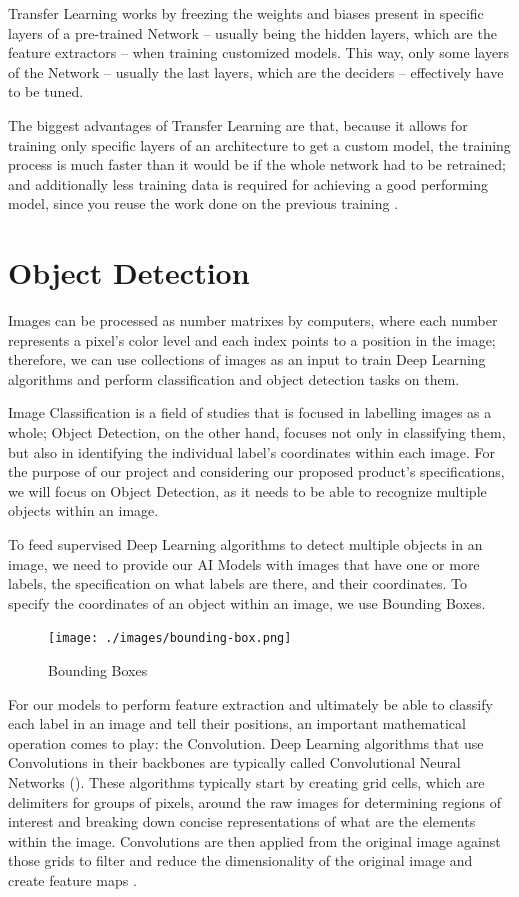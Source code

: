 \documentclass[openright]{normas-utf-tex} %
\begin{document}
Transfer Learning works by freezing the weights and biases present in specific layers of a
pre-trained Network -- usually being the hidden layers, which are the feature extractors -- 
when training customized models. This way,  only some layers of the Network -- usually the last layers, which 
are the deciders -- effectively have to be tuned.

The biggest advantages of Transfer Learning are that, because it allows for
training only specific layers of an architecture to get a custom model, the
training process is much faster than it would be if the whole network had to be
retrained; and additionally less training data is required for achieving a good
performing model, since you reuse the work done on the previous training
\cite{CS231N}.

\section{Object Detection}

Images can be processed as number matrixes by computers, where each number represents a 
pixel's color level and each index points to a position in the image;
therefore, we can use collections of images as an input to train Deep Learning algorithms 
and perform classification and object detection tasks on them. 

Image Classification is a field of studies that is focused in labelling images as a whole; 
Object Detection, on the other hand, focuses not only in classifying them, but also in identifying the individual
label's coordinates within each image. For the purpose of our project and considering our proposed product's specifications,
we will focus on Object Detection, as it needs to be able to recognize multiple objects within an image. 

To feed supervised Deep Learning algorithms to detect multiple objects in an image, we need to provide our AI Models with 
images that have one or more labels, the specification on what labels are there, and their coordinates.
To specify the coordinates of an object within an image, we use Bounding Boxes.

\begin{figure}[H]
	\centering
	\texttt{[image: ./images/bounding-box.png]}
	\caption[Bounding Boxes]{Bounding Boxes}
	\label{fig:boundingBoxes}
\end{figure}

For our models to perform feature extraction and ultimately be able to classify each label in an image and tell their positions,
an important mathematical operation comes to play: the Convolution. 
Deep Learning algorithms that use Convolutions in their backbones are typically called Convolutional Neural Networks
(). 
These algorithms typically start by creating grid cells, which are delimiters for groups of pixels, around the raw images for 
determining regions of interest and breaking down concise representations of what are the elements within the image.
Convolutions are then applied from the original image against those grids to filter and reduce the dimensionality of
the original image and create feature maps \cite{ObjectDetectionDeepLearning}. 
\end{document}

